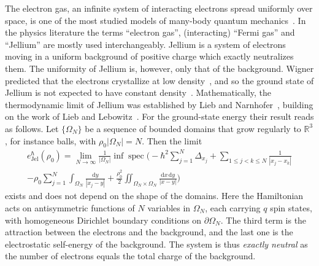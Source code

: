 \documentclass[final,reqno]{amsart}
\DeclareMathOperator{\spec}{spec}
\theoremstyle{remark}
\theoremstyle{definition}
\renewcommand{\le}{\leqslant}
\newcommand{\RR}{\mathbb{R}}
\newcommand{\Jel}{\mathrm{Jel}}
\begin{document}
The electron gas, an infinite system of interacting electrons spread uniformly over space, is one of the most studied models of many-body quantum mechanics~\cite{giuliani2005quantum}. In the physics literature the terms ``electron gas'', (interacting) ``Fermi gas'' and ``Jellium'' are mostly used interchangeably. Jellium is a system of electrons moving in a uniform background of positive charge which exactly neutralizes them. The uniformity of Jellium is, however, only that of the background. Wigner predicted that the electrons crystallize at low density~\cite{wigner1934interaction}, and so the ground state of Jellium is not expected to have constant density~\cite{lewin2019floating}. Mathematically, the thermodynamic limit of Jellium was established by Lieb and Narnhofer~\cite{lieb1975thermodynamic}, building on the work of Lieb and Lebowitz~\cite{lieb1972constitution}. For the ground-state energy their result reads as follows. Let $\{\Omega_N\}$ be a sequence of bounded domains that grow regularly to $\RR^3$, for instance balls, with $\rho_0|\Omega_N|=N$. Then the limit
\begin{multline*}
e^\hbar_\Jel(\rho_0)=\lim_{N\to\infty}\frac1{|\Omega_N|}\inf\spec\bigg(-\hbar^2\sum_{j=1}^N\Delta_{x_j}+\sum_{1\le j<k\le N}\frac{1}{|x_j-x_k|}\\
-\rho_0\sum_{j=1}^N\int_{\Omega_N}\frac{\mathrm dy}{|x_j-y|}+\frac{\rho_0^2}2\iint_{\Omega_N\times\Omega_N}\frac{\mathrm dx\,\mathrm dy}{|x-y|}\bigg)
\end{multline*}
exists and does not depend on the shape of the domains. Here the Hamiltonian acts on antisymmetric functions of $N$ variables in $\Omega_N$, each carrying $q$ spin states, with homogeneous Dirichlet boundary conditions on $\partial\Omega_N$. The third term is the attraction between the electrons and the background, and the last one is the electrostatic self-energy of the background. The system is thus \emph{exactly neutral} as the number of electrons equals the total charge of the background.
\end{document}

